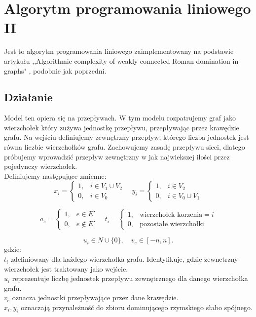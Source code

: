 \FloatBarrier
\section{Algorytm programowania liniowego II}
Jest to algorytm programowania liniowego zaimplementowany na podstawie artykułu ,,Algorithmic complexity of weakly connected Roman domination in graphs" \cite{ILP}, podobnie jak poprzedni.
\subsection{Działanie}
Model ten opiera się na przepływach. W tym modelu rozpatrujemy graf jako wierzchołek który zużywa jednostkę przepływu, przepływając przez krawędzie grafu. Na wejściu definiujemy zewnętrzny przepływ, którego liczba jednostek jest równa liczbie wierzchołków grafu. Zachowujemy zasadę przepływu sieci, dlatego próbujemy wprowadzić przepływ zewnętrzny w jak najwiekszej ilości przez pojedynczy wierzchołek.\\
Definiujemy następujące zmienne:
\[
x_i =
\begin{cases}
1, & i \in V_1 \cup V_2 \\
0, & i \in V_0
\end{cases}
\quad
y_i =
\begin{cases}
1, & i \in V_2 \\
0, & i \in V_0 \cup V_1
\end{cases}
\]

\[
a_e =
\begin{cases}
1, & e \in E' \\
0, & e \notin E'
\end{cases}
\quad
t_i =
\begin{cases}
1, & \text{wierzchołek korzenia} = i \\
0, & \text{pozostałe wierzchołki}
\end{cases}
\]

\[
u_i \in N \cup \{0\}, \quad v_e \in [-n, n].
\]
gdzie:\\
$t_i$ zdefiniowany dla każdego wierzchołka grafu. Identyfikuje, gdzie zewnetrzny wierzchołek jest traktowany jako wejście. \\
$u_i$ reprezentuje liczbę jednostek przepływu zewnętrznego dla danego wierzchołka grafu.\\
$v_e$ oznacza jednostki przepływające przez dane krawędzie.\\
$x_i, y_i$ oznaczają przynależność do zbioru dominującego rzymskiego słabo spójnego.

